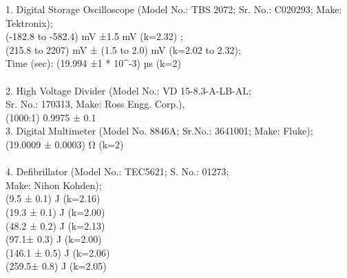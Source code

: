 1. Digital Storage Oscilloscope (Model No.: TBS 2072; Sr. No.: C020293; Make: Tektronix);  \\
(-182.8 to -582.4) mV ±1.5 mV (k=2.32) ;  \\
(215.8 to 2207) mV ± (1.5 to 2.0) mV (k=2.02 to 2.32);  \\
Time (sec): (19.994 ±1 * 10^-3) µs (k=2) \\
 \\
2. High Voltage Divider (Model No.: VD 15-8.3-A-LB-AL; \\
Sr. No.: 170313, Make: Ross Engg. Corp.), \\
(1000:1) 0.9975 ± 0.1%
 \\
3. Digital Multimeter (Model No. 8846A; Sr.No.: 3641001; Make: Fluke); \\
(19.0009 ± 0.0003) Ω (k=2) \\
 \\
4. Defibrillator (Model No.: TEC5621; S. No.: 01273; \\
Make: Nihon Kohden); \\
(9.5 ± 0.1) J (k=2.16) \\
(19.3 ± 0.1) J (k=2.00) \\
(48.2 ± 0.2) J (k=2.13) \\
(97.1± 0.3) J (k=2.00) \\
(146.1 ± 0.5) J (k=2.06) \\
(259.5± 0.8) J (k=2.05)